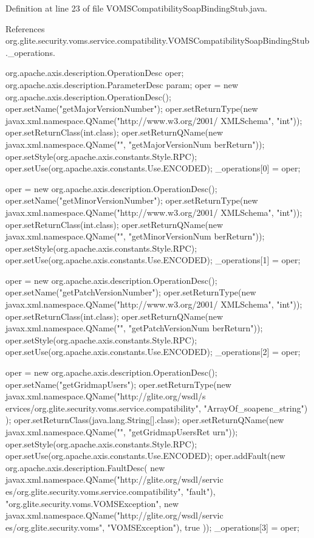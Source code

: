 Definition at line 23 of file VOMSCompatibilitySoapBindingStub.java.



References org.glite.security.voms.service.compatibility.VOMSCompatibilitySoapBindingStub.\_\-operations.


\begin{DoxyCode}
                                             {
        org.apache.axis.description.OperationDesc oper;
        org.apache.axis.description.ParameterDesc param;
        oper = new org.apache.axis.description.OperationDesc();
        oper.setName("getMajorVersionNumber");
        oper.setReturnType(new javax.xml.namespace.QName("http://www.w3.org/2001/
      XMLSchema", "int"));
        oper.setReturnClass(int.class);
        oper.setReturnQName(new javax.xml.namespace.QName("", "getMajorVersionNum
      berReturn"));
        oper.setStyle(org.apache.axis.constants.Style.RPC);
        oper.setUse(org.apache.axis.constants.Use.ENCODED);
        _operations[0] = oper;

        oper = new org.apache.axis.description.OperationDesc();
        oper.setName("getMinorVersionNumber");
        oper.setReturnType(new javax.xml.namespace.QName("http://www.w3.org/2001/
      XMLSchema", "int"));
        oper.setReturnClass(int.class);
        oper.setReturnQName(new javax.xml.namespace.QName("", "getMinorVersionNum
      berReturn"));
        oper.setStyle(org.apache.axis.constants.Style.RPC);
        oper.setUse(org.apache.axis.constants.Use.ENCODED);
        _operations[1] = oper;

        oper = new org.apache.axis.description.OperationDesc();
        oper.setName("getPatchVersionNumber");
        oper.setReturnType(new javax.xml.namespace.QName("http://www.w3.org/2001/
      XMLSchema", "int"));
        oper.setReturnClass(int.class);
        oper.setReturnQName(new javax.xml.namespace.QName("", "getPatchVersionNum
      berReturn"));
        oper.setStyle(org.apache.axis.constants.Style.RPC);
        oper.setUse(org.apache.axis.constants.Use.ENCODED);
        _operations[2] = oper;

        oper = new org.apache.axis.description.OperationDesc();
        oper.setName("getGridmapUsers");
        oper.setReturnType(new javax.xml.namespace.QName("http://glite.org/wsdl/s
      ervices/org.glite.security.voms.service.compatibility", "ArrayOf_soapenc_string")
      );
        oper.setReturnClass(java.lang.String[].class);
        oper.setReturnQName(new javax.xml.namespace.QName("", "getGridmapUsersRet
      urn"));
        oper.setStyle(org.apache.axis.constants.Style.RPC);
        oper.setUse(org.apache.axis.constants.Use.ENCODED);
        oper.addFault(new org.apache.axis.description.FaultDesc(
                      new javax.xml.namespace.QName("http://glite.org/wsdl/servic
      es/org.glite.security.voms.service.compatibility", "fault"),
                      "org.glite.security.voms.VOMSException",
                      new javax.xml.namespace.QName("http://glite.org/wsdl/servic
      es/org.glite.security.voms", "VOMSException"), 
                      true
                     ));
        _operations[3] = oper;

}
\end{DoxyCode}
